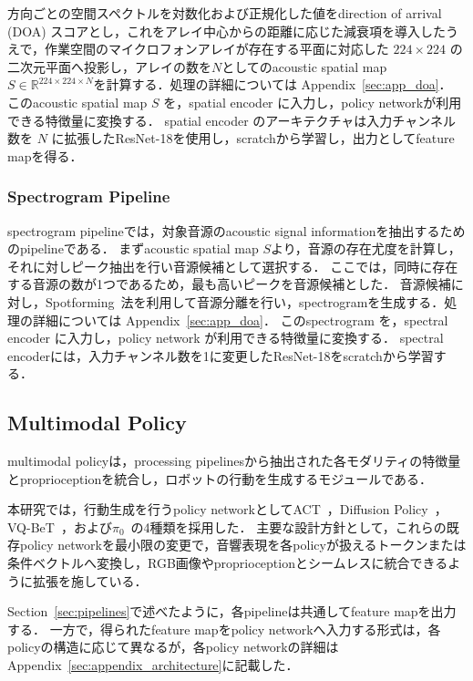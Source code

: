 \documentclass{article}
\begin{document}
	方向ごとの空間スペクトルを対数化および正規化した値をdirection of arrival (DOA) スコアとし，これをアレイ中心からの距離に応じた減衰項を導入したうえで，作業空間のマイクロフォンアレイが存在する平面に対応した $224\times224$ の二次元平面へ投影し，アレイの数を$N$としてのacoustic spatial map $S\in\mathbb{R}^{224\times224\times N}$を計算する．処理の詳細については Appendix~\ref{sec:app_doa}．
	このacoustic spatial map $S$ を，spatial encoder に入力し，policy networkが利用できる特徴量に変換する．
	spatial encoder のアーキテクチャは入力チャンネル数を $N$ に拡張したResNet-18を使用し，scratchから学習し，出力としてfeature mapを得る．
	

\subsubsection{Spectrogram Pipeline}
\label{sec:spec}
	spectrogram pipelineでは，対象音源のacoustic signal informationを抽出するためのpipelineである．
	まずacoustic spatial map $S$より，音源の存在尤度を計算し，それに対しピーク抽出を行い音源候補として選択する．
	ここでは，同時に存在する音源の数が1つであるため，最も高いピークを音源候補とした．
	音源候補に対し，Spotforming~\citep{spotforming_nmf}法を利用して音源分離を行い，spectrogramを生成する．処理の詳細については Appendix~\ref{sec:app_doa}．
	このspectrogram を，spectral encoder に入力し，policy network が利用できる特徴量に変換する．
	spectral encoderには，入力チャンネル数を1に変更したResNet-18をscratchから学習する．


\subsection{Multimodal Policy}
\label{sec:policy}
	multimodal policyは，processing pipelinesから抽出された各モダリティの特徴量とproprioceptionを統合し，ロボットの行動を生成するモジュールである．

	本研究では，行動生成を行うpolicy networkとしてACT~\citep{act}，Diffusion Policy~\citep{diffusionpolicy}，VQ-BeT~\citep{vqbet}，および$\pi_0$~\citep{pi0}の4種類を採用した．
	主要な設計方針として，これらの既存policy networkを最小限の変更で，音響表現を各policyが扱えるトークンまたは条件ベクトルへ変換し，RGB画像やproprioceptionとシームレスに統合できるように拡張を施している．

	Section~\ref{sec:pipelines}で述べたように，各pipelineは共通してfeature mapを出力する．
	一方で，得られたfeature mapをpolicy networkへ入力する形式は，各policyの構造に応じて異なるが，各policy networkの詳細はAppendix~\ref{sec:appendix_architecture}に記載した．
\end{document}
